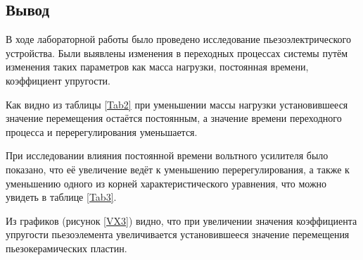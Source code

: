 \documentclass[a4paper,12pt]{article} %
\begin{document}
\newpage
\begin{center}
	\section*{Вывод}
\end{center}
\par
В ходе лабораторной работы было проведено исследование пьезоэлектрического устройства. 
Были выявлены изменения в переходных процессах системы путём изменения таких параметров как масса нагрузки, постоянная времени, коэффициент упругости.\par
Как видно из таблицы \ref{Tab2} при уменьшении массы нагрузки установившееся значение перемещения остаётся постоянным, а значение времени переходного процесса и перерегулирования уменьшается. \par
При исследовании влияния постоянной времени вольтного усилителя было показано, что её увеличение ведёт к уменьшению перерегулирования, а также к уменьшению одного из корней характеристического уравнения, что можно увидеть в таблице \ref{Tab3}.\par
Из графиков (рисунок \ref{VX3}) видно, что при увеличении значения коэффициента упругости пьезоэлемента увеличивается установившееся значение перемещения пьезокерамических пластин.
\end{document}
